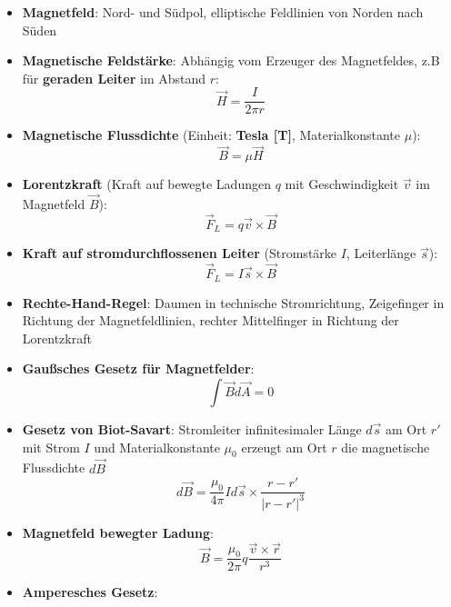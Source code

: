 \begin{itemize}
	\item \textbf{Magnetfeld}: Nord- und Südpol, elliptische Feldlinien von Norden nach Süden
	\item \textbf{Magnetische Feldstärke}: Abhängig vom Erzeuger des Magnetfeldes, z.B für \textbf{geraden Leiter} im Abstand $r$:
	\begin{equation}
		\vec{H} = \frac{I}{2\pi r}
	\end{equation}
	\item \textbf{Magnetische Flussdichte} (Einheit: \textbf{Tesla [T]}, Materialkonstante $\mu$):
	\begin{equation}
		\vec{B} = \mu\vec{H}
	\end{equation}
	\item \textbf{Lorentzkraft} (Kraft auf bewegte Ladungen $q$ mit Geschwindigkeit $\vec{v}$ im Magnetfeld $\vec{B}$):
	\begin{equation}
		\vec{F}_L = q\vec{v}\times\vec{B}
	\end{equation}
	\item \textbf{Kraft auf stromdurchflossenen Leiter} (Stromstärke $I$, Leiterlänge $\vec{s}$):
	\begin{equation}
		\vec{F}_L = I\vec{s}\times\vec{B}
	\end{equation}
	\item \textbf{Rechte-Hand-Regel}: Daumen in technische Stromrichtung, Zeigefinger in Richtung der Magnetfeldlinien, rechter Mittelfinger in Richtung der Lorentzkraft
	\item \textbf{Gaußsches Gesetz für Magnetfelder}:
	\begin{equation}
		\int \vec{B}d\vec{A} = 0
	\end{equation}
	\item \textbf{Gesetz von Biot-Savart}: Stromleiter infinitesimaler Länge $d\vec{s}$ am Ort $r'$ mit Strom $I$ und Materialkonstante $\mu_0$ erzeugt am Ort $r$ die magnetische Flussdichte $d\vec{B}$
	\begin{equation}
		d\vec{B} = \frac{\mu_0}{4\pi}Id\vec{s}\times\frac{r - r'}{|r - r'|^3}
	\end{equation}
	\item \textbf{Magnetfeld bewegter Ladung}:
	\begin{equation}
		\vec{B} = \frac{\mu_0}{2\pi}q\frac{\vec{v}\times\vec{r}}{r^3}
	\end{equation}
	\item \textbf{Amperesches Gesetz}:
	\begin{equation}

\end{equation}
\end{itemize}
